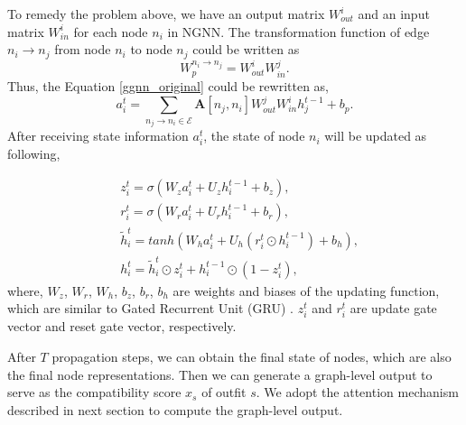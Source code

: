 \documentclass[sigconf]{acmart}
\begin{document}
 To remedy the problem above, we have an output matrix $W_{out}^{i}$ and an input matrix $W_{in}^{i}$ for each node $n_{i}$ in NGNN. The transformation function of edge $n_{i} \rightarrow n_{j}$ from node $n_{i}$ to node $n_{j}$ could be written as
\begin{equation} \label{W_inout}
W_{p}^{n_{i} \rightarrow n_{j}} = W_{out}^{i}W_{in}^{j}.
\end{equation}
Thus, the Equation \ref{ggnn_original} could be rewritten as, \begin{equation} \label{ggnn_1}
a_{i}^{t} = \sum_{n_{j} \rightarrow n_{i} \in \mathcal{E}} \textbf{A}[n_{j}, n_{i}]W_{out}^{j}W_{in}^{i} h_{j}^{t-1} + b_{p}.
\end{equation}
After receiving state information $a_{i}^{t}$, the state of node $n_{i}$ will be updated as following,

\begin{align}
& z_{i}^{t} =  \sigma(W_{z} a_{i}^{t} + U_{z}h_{i}^{t-1} + b_{z}),\\
& r_{i}^{t} =  \sigma(W_{r} a_{i}^{t} + U_{r}h_{i}^{t-1} + b_{r}),\\
& \tilde{h}_{i}^{t} =  tanh(W_{h} a_{i}^{t} + U_{h}(r_{i}^{t} \odot h_{i}^{t-1}) + b_{h}), \\
& h_{i}^{t} = \tilde{h}_{i}^{t} \odot z_{i}^{t} + h_{i}^{t-1} \odot (1-z_{i}^{t}),~
\end{align}
where, $W_{z}$, $W_{r}$, $W_{h}$, $b_{z}$, $b_{r}$, $b_{h}$ are weights and biases of the updating function, which are similar to Gated Recurrent Unit (GRU) \cite{li2015gated}. $z_{i}^{t}$ and $r_{i}^{t}$ are update gate vector and reset gate vector, respectively.


After $T$ propagation steps, we can obtain the final state of nodes, which are also the final node representations.
Then we can generate a graph-level output to serve as the compatibility score $x_{s}$ of outfit $s$. We adopt the attention mechanism described in next section to compute the graph-level output.
\end{document}
